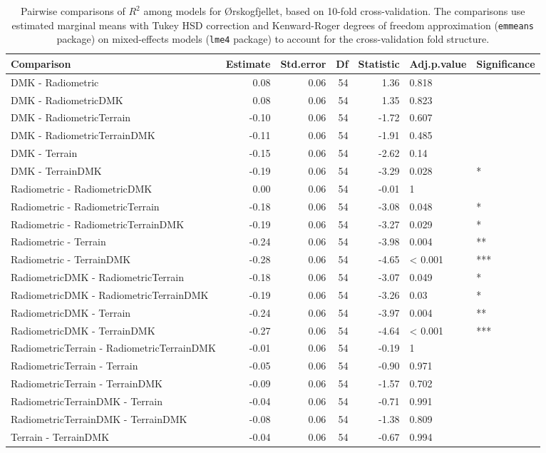 \documentclass[soil, manuscript]{copernicus}
\begin{document}
\begin{table}[h]

\caption{\label{tab:pairwiseOrskogRsq}Pairwise comparisons of $R^2$ among models for Ørskogfjellet, based on 10-fold cross-validation. The comparisons use estimated marginal means with Tukey HSD correction and Kenward-Roger degrees of freedom approximation (\texttt{emmeans} package) on mixed-effects models (\texttt{lme4} package) to account for the cross-validation fold structure.}
\centering
\begin{tabular}[t]{lrrrrll}
\hline
Comparison & Estimate & Std.error & Df & Statistic & Adj.p.value & Significance\\
\hline
DMK - Radiometric & 0.08 & 0.06 & 54 & 1.36 & 0.818 & \\
DMK - RadiometricDMK & 0.08 & 0.06 & 54 & 1.35 & 0.823 & \\
DMK - RadiometricTerrain & -0.10 & 0.06 & 54 & -1.72 & 0.607 & \\
DMK - RadiometricTerrainDMK & -0.11 & 0.06 & 54 & -1.91 & 0.485 & \\
DMK - Terrain & -0.15 & 0.06 & 54 & -2.62 & 0.14 & \\
DMK - TerrainDMK & -0.19 & 0.06 & 54 & -3.29 & 0.028 & *\\
Radiometric - RadiometricDMK & 0.00 & 0.06 & 54 & -0.01 & 1 & \\
Radiometric - RadiometricTerrain & -0.18 & 0.06 & 54 & -3.08 & 0.048 & *\\
Radiometric - RadiometricTerrainDMK & -0.19 & 0.06 & 54 & -3.27 & 0.029 & *\\
Radiometric - Terrain & -0.24 & 0.06 & 54 & -3.98 & 0.004 & **\\
Radiometric - TerrainDMK & -0.28 & 0.06 & 54 & -4.65 & < 0.001 & ***\\
RadiometricDMK - RadiometricTerrain & -0.18 & 0.06 & 54 & -3.07 & 0.049 & *\\
RadiometricDMK - RadiometricTerrainDMK & -0.19 & 0.06 & 54 & -3.26 & 0.03 & *\\
RadiometricDMK - Terrain & -0.24 & 0.06 & 54 & -3.97 & 0.004 & **\\
RadiometricDMK - TerrainDMK & -0.27 & 0.06 & 54 & -4.64 & < 0.001 & ***\\
RadiometricTerrain - RadiometricTerrainDMK & -0.01 & 0.06 & 54 & -0.19 & 1 & \\
RadiometricTerrain - Terrain & -0.05 & 0.06 & 54 & -0.90 & 0.971 & \\
RadiometricTerrain - TerrainDMK & -0.09 & 0.06 & 54 & -1.57 & 0.702 & \\
RadiometricTerrainDMK - Terrain & -0.04 & 0.06 & 54 & -0.71 & 0.991 & \\
RadiometricTerrainDMK - TerrainDMK & -0.08 & 0.06 & 54 & -1.38 & 0.809 & \\
Terrain - TerrainDMK & -0.04 & 0.06 & 54 & -0.67 & 0.994 & \\
\hline
\end{tabular}
\end{table}
\clearpage
\end{document}
